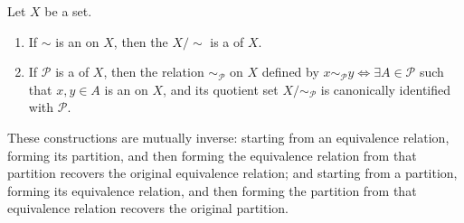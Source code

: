 \begin{lemma}
\label{lemma:equivalence_relations_on_a_set_correspond_to_partitions}
Let $X$ be a set.
\begin{enumerate}
    \item If $\sim$ is an  on $X$, then the  $X / {\sim}$ is a  of $X$.
    \item If $\mathcal{P}$ is a  of $X$, then the relation $\sim_{\mathcal{P}}$ on $X$ defined by $x \sim_{\mathcal{P}} y \iff \exists A \in \mathcal{P}$ such that $x, y \in A$ is an  on $X$, and its quotient set $X / {\sim_{\mathcal{P}}}$ is canonically identified with $\mathcal{P}$.
\end{enumerate}
These constructions are mutually inverse: starting from an equivalence relation, forming its partition, and then forming the equivalence relation from that partition recovers the original equivalence relation; and starting from a partition, forming its equivalence relation, and then forming the partition from that equivalence relation recovers the original partition.
\end{lemma}
